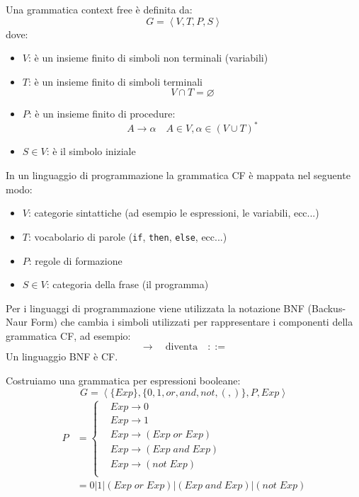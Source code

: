 \documentclass[a4paper]{article}
\begin{document}
\begin{definition}
  Una grammatica context free è definita da:
  \[
    G = \left<V, T, P, S \right>
  \] 
  dove:
  \begin{itemize}
    \item \( V \): è un insieme finito di simboli non terminali (variabili)
    \item \( T \): è un insieme finito di simboli terminali
      \[
        V \cap T = \varnothing
      \] 
    \item \( P \): è un insieme finito di procedure:
      \[
        A \to \alpha \quad A \in V, \alpha \in (V \cup T)^*
      \] 
    \item \( S \in V \): è il simbolo iniziale
  \end{itemize}
  In un linguaggio di programmazione la grammatica CF è mappata nel seguente modo:
  \begin{itemize}
    \item \( V \): categorie sintattiche (ad esempio le espressioni, le variabili, ecc...)
    \item \( T \): vocabolario di parole (\texttt{if}, \texttt{then}, \texttt{else}, ecc...)
    \item \( P \): regole di formazione
    \item \( S \in V \): categoria della frase (il programma)
  \end{itemize}

  \vspace{1em}
  \noindent

\end{definition}

\begin{define}
  Per i linguaggi di programmazione viene utilizzata la notazione BNF (Backus-Naur Form)
  che cambia i simboli utilizzati per rappresentare i componenti della grammatica CF,
  ad esempio:
  \[
    \to \quad \text{diventa} \quad ::=
  \] 
  Un linguaggio BNF è CF.
\end{define}

\begin{example}
  Costruiamo una grammatica per espressioni booleane:
  \[
    G = \left< \{Exp\}, \{0, 1, or, and, not, (, )\}, P, Exp \right>
  \] 
  \[
    \begin{aligned}
      P &= \left\{
        \begin{aligned}
        & Exp \to 0 \\
        & Exp \to 1 \\
        & Exp \to (Exp \; or \; Exp) \\
        & Exp \to (Exp \; and \; Exp) \\
        & Exp \to (not \; Exp) \\
        \end{aligned}
      \right.\\
        &= 0 | 1 | (Exp \; or \; Exp) | (Exp \; and \; Exp) | (not \; Exp)
    \end{aligned}
  \] 
\end{example}
\end{document}
